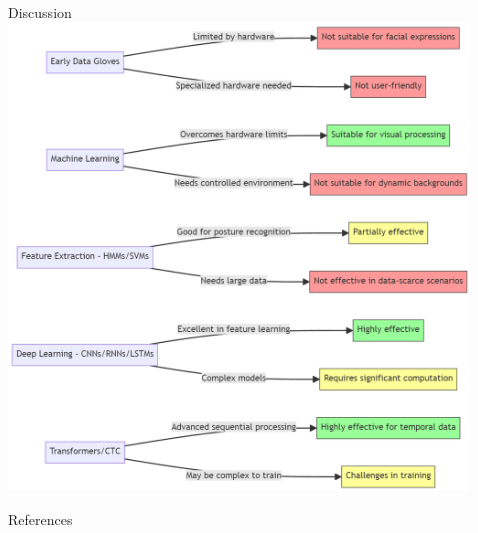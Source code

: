 \documentclass{beamer} %
\begin{document}
\begin{frame}[t]
\begin{columns}[t]
\begin{column}{0.3\textwidth}
			\begin{block}{Discussion}
				\includegraphics[width=\linewidth]{mermaid-diagram-discussion.png}
			\end{block}


			\begin{block}{References}
				\fontsize{6}{10}\selectfont
				\vspace{-1ex} %
				
				
			\end{block}


		\end{column}

		\begin{column}{0.02\textwidth}\end{column} %

		\begin{column}{0.3\textwidth} %


\end{column}
\end{columns}
\end{frame}
\end{document}

